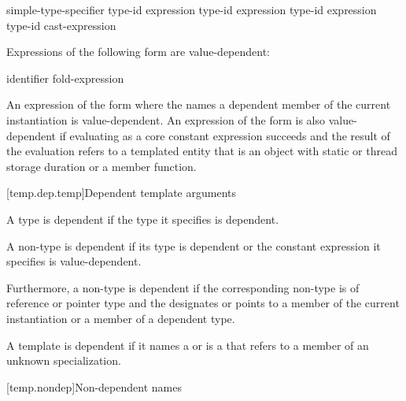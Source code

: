 \begin{ncsimplebnf}
simple-type-specifier \terminal{(}  \terminal{)}\br
{} \terminal{<} type-id \terminal{>} \terminal{(} expression \terminal{)}\br
{} \terminal{<} type-id \terminal{>} \terminal{(} expression \terminal{)}\br
{} \terminal{<} type-id \terminal{>} \terminal{(} expression \terminal{)}\br
\terminal{(} type-id \terminal{)} cast-expression
\end{ncsimplebnf}

\pnum
Expressions of the following form are value-dependent:

\begin{ncsimplebnf}
  \terminal{(} identifier \terminal{)}\br
fold-expression
\end{ncsimplebnf}

\pnum
An expression of the form \tcode{\&} where the
 names a dependent member of the current
instantiation is value-dependent.
An expression of the form \tcode{\&}
is also value-dependent if evaluating 
as a core constant expression succeeds and
the result of the evaluation refers to a templated entity
that is an object with static or thread storage duration or a member function.

[temp.dep.temp]{Dependent template arguments}

\pnum
A type
is dependent if the type it specifies is dependent.

\pnum
A non-type
is dependent if its type is dependent or the constant
expression it specifies is value-dependent.

\pnum
Furthermore, a non-type
is dependent if the corresponding non-type 
is of reference or pointer type and the 
designates or points to a member of the current instantiation or a member of
a dependent type.

\pnum
A template
is dependent if it names a
or is a
that refers to a member of an unknown specialization.

[temp.nondep]{Non-dependent names}

